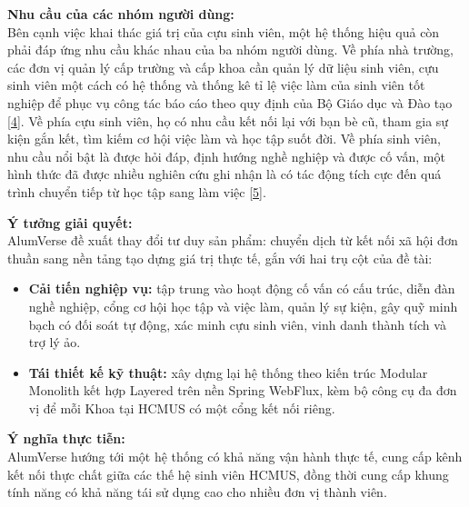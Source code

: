 \documentclass[12pt,a4paper]{article}
\begin{document}
\vspace{-10pt}
\textbf{Nhu cầu của các nhóm người dùng:} \\
Bên cạnh việc khai thác giá trị của cựu sinh viên, một hệ thống hiệu quả còn phải đáp ứng nhu cầu khác nhau của ba nhóm người dùng. Về phía nhà trường, các đơn vị quản lý cấp trường và cấp khoa cần quản lý dữ liệu sinh viên, cựu sinh viên một cách có hệ thống và thống kê tỉ lệ việc làm của sinh viên tốt nghiệp để phục vụ công tác báo cáo theo quy định của Bộ Giáo dục và Đào tạo \hyperref[ref:moet]{[4]}. Về phía cựu sinh viên, họ có nhu cầu kết nối lại với bạn bè cũ, tham gia sự kiện gắn kết, tìm kiếm cơ hội việc làm và học tập suốt đời. Về phía sinh viên, nhu cầu nổi bật là được hỏi đáp, định hướng nghề nghiệp và được cố vấn, một hình thức đã được nhiều nghiên cứu ghi nhận là có tác động tích cực đến quá trình chuyển tiếp từ học tập sang làm việc \hyperref[ref:nabi]{[5]}.

\textbf{Ý tưởng giải quyết:}\\
AlumVerse đề xuất thay đổi tư duy sản phẩm: chuyển dịch từ kết nối xã hội đơn thuần sang nền tảng tạo dựng giá trị thực tế, gắn với hai trụ cột của đề tài:
\vspace{-6pt}
\begin{itemize}
    \item \textbf{Cải tiến nghiệp vụ:} tập trung vào hoạt động cố vấn có cấu trúc, diễn đàn nghề nghiệp, cổng cơ hội học tập và việc làm, quản lý sự kiện, gây quỹ minh bạch có đối soát tự động, xác minh cựu sinh viên, vinh danh thành tích và trợ lý ảo.
    \item \textbf{Tái thiết kế kỹ thuật:} xây dựng lại hệ thống theo kiến trúc Modular Monolith kết hợp Layered trên nền Spring WebFlux, kèm bộ công cụ đa đơn vị để mỗi Khoa tại HCMUS có một cổng kết nối riêng.
\end{itemize}
\vspace{-4pt}
\textbf{Ý nghĩa thực tiễn:} \\
AlumVerse hướng tới một hệ thống có khả năng vận hành thực tế, cung cấp kênh kết nối thực chất giữa các thế hệ sinh viên HCMUS, đồng thời cung cấp khung tính năng có khả năng tái sử dụng cao cho nhiều đơn vị thành viên.

\end{document}
